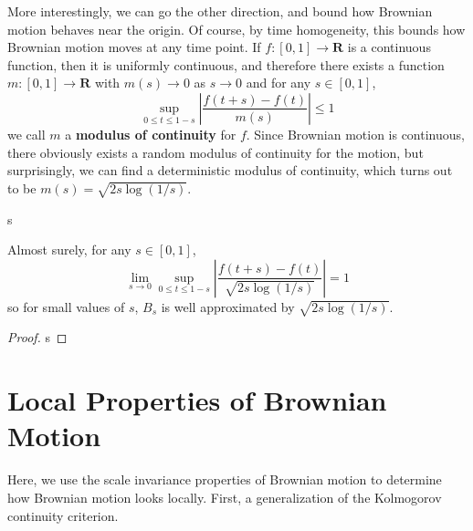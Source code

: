 More interestingly, we can go the other direction, and bound how Brownian motion behaves near the origin. Of course, by time homogeneity, this bounds how Brownian motion moves at any time point. If $f: [0,1] \to \mathbf{R}$ is a continuous function, then it is uniformly continuous, and therefore there exists a function $m: [0,1] \to \mathbf{R}$ with $m(s) \to 0$ as $s \to 0$ and for any $s \in [0,1]$,
%
\[ \sup_{0 \leq t \leq 1-s} \left| \frac{f(t + s) - f(t)}{m(s)}\right| \leq 1 \]
%
we call $m$ a {\bf modulus of continuity} for $f$. Since Brownian motion is continuous, there obviously exists a random modulus of continuity for the motion, but surprisingly, we can find a deterministic modulus of continuity, which turns out to be $m(s) = \sqrt{2s\log(1/s)}$.

\begin{lemma}
    s
\end{lemma}

\begin{theorem}
    Almost surely, for any $s \in [0,1]$,
    \[ \lim_{s \to 0} \sup_{0 \leq t \leq 1-s} \left| \frac{f(t+s) - f(t)}{\sqrt{2s\log(1/s)}} \right| = 1 \]
    so for small values of $s$, $B_s$ is well approximated by $\sqrt{2s \log(1/s)}$.
\end{theorem}
\begin{proof}
    s
\end{proof}

\section{Local Properties of Brownian Motion}



Here, we use the scale invariance properties of Brownian motion to determine how Brownian motion looks locally. First, a generalization of the Kolmogorov continuity criterion.

